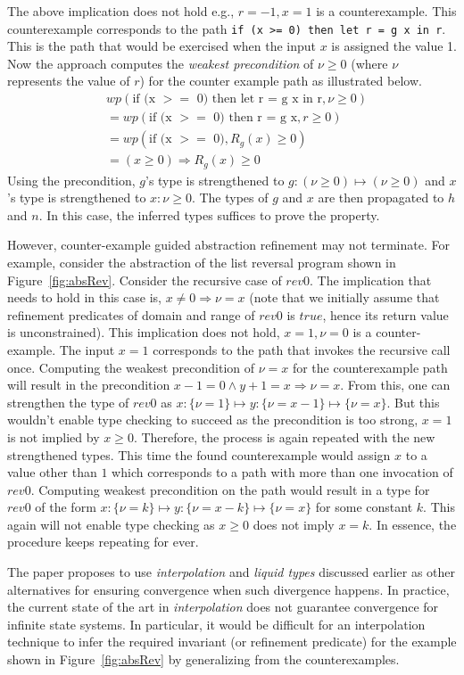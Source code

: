 The above implication does not hold e.g., $r = -1, x =1$ is a counterexample.
This counterexample corresponds to the path \texttt{if (x >= 0) then let r = g x in r}.
This is the path that would be exercised when the input $x$ is assigned the value 1.
Now the approach computes the \emph{weakest precondition} of $\nu \ge 0$ (where $\nu$ represents 
the value of $r$) for the counter example path as illustrated below.
%
\begin{align*}
& wp(\text{if (x $>=$ 0) then let r = g x in r}, \nu \ge 0) \\
& = wp(\text{if (x $>=$ 0) then r = g x}, r \ge 0)\\
& = wp(\text{if (x $>=$ 0)}, R_g(x) \ge 0) \\
& = (x \ge 0) \Rightarrow R_g(x) \ge 0
\end{align*}
%
Using the precondition, $g$'s type is strengthened to $g: (\nu \ge 0) \mapsto (\nu \ge 0)$ and 
$x$'s type is strengthened  to $x: \nu \ge 0$. The types of $g$ and $x$ are then propagated to $h$ and $n$.
In this case, the inferred types suffices to prove the property.

However, counter-example guided abstraction refinement may not terminate. For example, 
consider the abstraction of the list reversal program shown in Figure~\ref{fig:absRev}.
Consider the recursive case of $rev0$. The implication that needs to hold in this case is,
$x \ne 0 \Rightarrow \nu = x$ (note that we initially assume that refinement predicates of
domain and range of $rev0$ is $true$, hence its return value is unconstrained).
This implication does not hold, $x = 1,\nu = 0$ is a counter-example.
The input $x = 1$ corresponds to the path that invokes the recursive call once. 
Computing the weakest precondition of $\nu = x$ for the counterexample path will result in the 
precondition $x - 1 = 0 \wedge y + 1 = x \Rightarrow \nu = x$. From this, one can strengthen
the type of $rev0$ as $x:\{ \nu = 1 \} \mapsto y:\{ \nu = x - 1 \} \mapsto \{\nu = x \}$.
But this wouldn't enable type checking to succeed as the precondition is too strong, 
$x = 1$ is not implied by $x \ge 0$. 
Therefore, the process is again repeated with the  new strengthened types. This time
the found counterexample would assign $x$ to a value other than $1$ which corresponds 
to a path with more than one invocation of $rev0$. Computing weakest precondition on the path
would result in a type for $rev0$ of the form  
$x:\{ \nu = k \} \mapsto y:\{ \nu = x - k \} \mapsto \{\nu = x \}$  for some constant $k$.
This again will not enable type checking as $x \ge 0$ does not imply $x = k$.
In essence, the procedure keeps repeating for ever.

The paper proposes to use \emph{interpolation} and \emph{liquid types} \cite{rjhala:PLDI08} 
discussed earlier as other alternatives for ensuring convergence when such divergence happens. 
In practice, the current state of the art in \emph{interpolation} does not guarantee convergence for
infinite state systems. In particular, it would be difficult for an interpolation technique 
to infer the required invariant (or refinement predicate) for the example shown in Figure~\ref{fig:absRev}
by generalizing from the counterexamples.